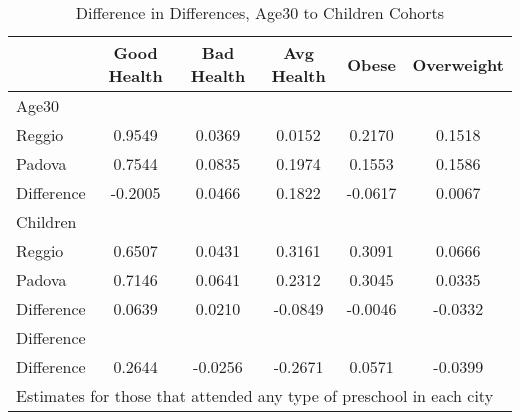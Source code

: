 \begin{table}[htbp]\centering
\caption{Difference in Differences, Age30 to Children Cohorts}
\begin{tabular}{l*{5}{c}}
\hline\hline
            & Good Health&  Bad Health&  Avg Health&       Obese&  Overweight\\
\hline
Age30       &            &            &            &            &            \\
Reggio      &      0.9549&      0.0369&      0.0152&      0.2170&      0.1518\\
Padova      &      0.7544&      0.0835&      0.1974&      0.1553&      0.1586\\
Difference  &     -0.2005&      0.0466&      0.1822&     -0.0617&      0.0067\\
\hline
Children    &            &            &            &            &            \\
Reggio      &      0.6507&      0.0431&      0.3161&      0.3091&      0.0666\\
Padova      &      0.7146&      0.0641&      0.2312&      0.3045&      0.0335\\
Difference  &      0.0639&      0.0210&     -0.0849&     -0.0046&     -0.0332\\
\hline
Difference  &            &            &            &            &            \\
Difference  &      0.2644&     -0.0256&     -0.2671&      0.0571&     -0.0399\\
\hline\hline
\multicolumn{6}{l}{\footnotesize Estimates for those that attended any type of preschool in each city}\\
\end{tabular}
\end{table}
